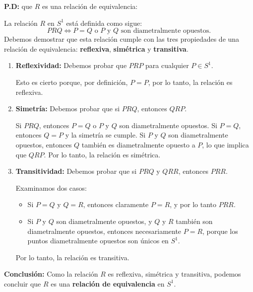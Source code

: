 \begin{solution}
\textbf{P.D:} que \( R \) es una relación de equivalencia:

La relación \( R \) en \( S^1 \) está definida como sigue:
\[
P R Q \iff P = Q \text{ o } P \text{ y } Q \text{ son diametralmente opuestos}.
\]
Debemos demostrar que esta relación cumple con las tres propiedades de una relación de equivalencia: \textbf{reflexiva}, \textbf{simétrica} y \textbf{transitiva}.

\begin{enumerate}[label=\arabic*.]
    \item \textbf{Reflexividad:}
    Debemos probar que \( P R P \) para cualquier \( P \in S^1 \).
    
    Esto es cierto porque, por definición, \( P = P \), por lo tanto, la relación es reflexiva.
    
    \item \textbf{Simetría:}
    Debemos probar que si \( P R Q \), entonces \( Q R P \).
    
    Si \( P R Q \), entonces \( P = Q \) o \( P \) y \( Q \) son diametralmente opuestos. Si \( P = Q \), entonces \( Q = P \) y la simetría se cumple. Si \( P \) y \( Q \) son diametralmente opuestos, entonces \( Q \) también es diametralmente opuesto a \( P \), lo que implica que \( Q R P \). Por lo tanto, la relación es simétrica.
    
    \item \textbf{Transitividad:}
    Debemos probar que si \( P R Q \) y \( Q R R \), entonces \( P R R \).
    
    Examinamos dos casos:
    
    \begin{itemize}
        \item Si \( P = Q \) y \( Q = R \), entonces claramente \( P = R \), y por lo tanto \( P R R \).
        \item Si \( P \) y \( Q \) son diametralmente opuestos, y \( Q \) y \( R \) también son diametralmente opuestos, entonces necesariamente \( P = R \), porque los puntos diametralmente opuestos son únicos en \( S^1 \).
    \end{itemize}
    
    Por lo tanto, la relación es transitiva.
\end{enumerate}

\textbf{Conclusión:}
Como la relación \( R \) es reflexiva, simétrica y transitiva, podemos concluir que \( R \) es una \textbf{relación de equivalencia} en \( S^1 \).


\end{solution}
